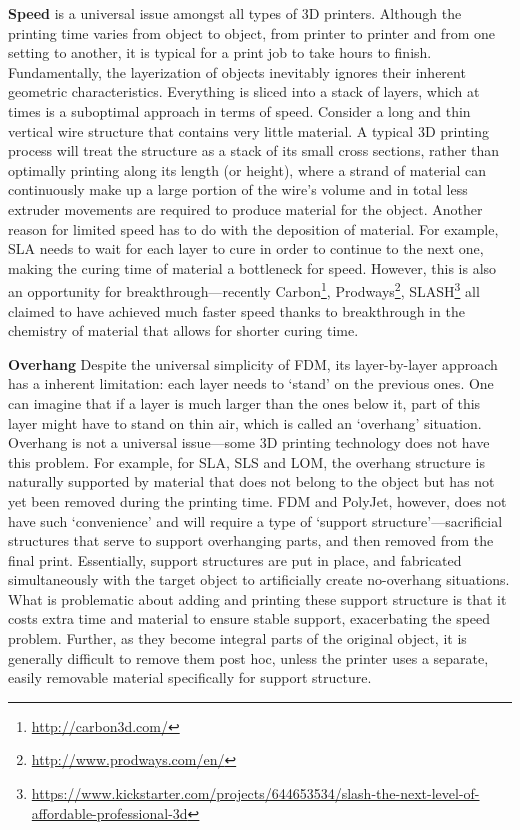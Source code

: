 \textbf{Speed} is a universal issue amongst all types of 3D printers. Although the printing time varies from object to object, from printer to printer and from one setting to another, it is typical for a print job to take hours to finish. Fundamentally, the layerization of objects inevitably ignores their inherent geometric characteristics. Everything is sliced into a stack of layers, which at times is a suboptimal approach in terms of speed. Consider a long and thin vertical wire structure that contains very little material. A typical 3D printing process will treat the structure as a stack of its small cross sections, rather than optimally printing along its length (or height), where a strand of material can continuously make up a large portion of the wire's volume and in total less extruder movements are required to produce material for the object. Another reason for limited speed has to do with the deposition of material. For example, SLA needs to wait for each layer to cure in order to continue to the next one, making the curing time of material a bottleneck for speed. However, this is also an opportunity for breakthrough---recently Carbon\footnote{\url{http://carbon3d.com/}}, Prodways\footnote{\url{http://www.prodways.com/en/}}, SLASH\footnote{\url{https://www.kickstarter.com/projects/644653534/slash-the-next-level-of-affordable-professional-3d}} all claimed to have achieved much faster speed thanks to breakthrough in the chemistry of material that allows for shorter curing time.

\textbf{Overhang} Despite the universal simplicity of FDM, its layer-by-layer approach has a inherent limitation: each layer needs to `stand' on the previous ones. One can imagine that if a layer is much larger than the ones below it, part of this layer might have to stand on thin air, which is called an `overhang' situation. Overhang is not a universal issue---some 3D printing technology does not have this problem. For example, for SLA, SLS and LOM, the overhang structure is naturally supported by material that does not belong to the object but has not yet been removed during the printing time. FDM and PolyJet, however, does not have such `convenience' and will require a type of `support structure'---sacrificial structures that serve to support overhanging parts, and then removed from the final print. Essentially, support structures are put in place, and fabricated simultaneously with the target object to artificially create no-overhang situations. What is problematic about adding and printing these support structure is that it costs extra time and material to ensure stable support, exacerbating the speed problem. Further, as they become integral parts of the original object, it is generally difficult to remove them post hoc, unless the printer uses a separate, easily removable material specifically for support structure.

